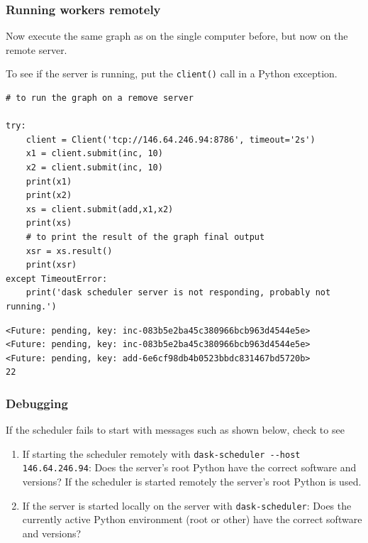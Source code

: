 \subsubsection{Running workers remotely}
\label{sec:Runningworkersremotely}

Now execute the same graph as on the single computer before, but now on the remote server.


To see if the server is running, put the \verb+client()+ call in a Python exception.



\begin{lstlisting}[style=incellstyle]
# to run the graph on a remove server

try:
    client = Client('tcp://146.64.246.94:8786', timeout='2s')
    x1 = client.submit(inc, 10)
    x2 = client.submit(inc, 10)
    print(x1)
    print(x2)
    xs = client.submit(add,x1,x2)
    print(xs)
    # to print the result of the graph final output
    xsr = xs.result()
    print(xsr)
except TimeoutError:
    print('dask scheduler server is not responding, probably not running.')

\end{lstlisting}


\begin{lstlisting}[style=outcellstyle]
<Future: pending, key: inc-083b5e2ba45c380966bcb963d4544e5e>
<Future: pending, key: inc-083b5e2ba45c380966bcb963d4544e5e>
<Future: pending, key: add-6e6cf98db4b0523bbdc831467bd5720b>
22

\end{lstlisting}


\subsubsection{Debugging}
\label{sec:Debugging}

If the scheduler fails to start with messages such as shown below, check to see


\begin{enumerate}
\item If starting the scheduler remotely with \verb+dask-scheduler --host 146.64.246.94+: Does the server's root Python have the correct software and versions? If the scheduler is started remotely the server's root Python is used.
\item If the server is started locally on the server with \verb+dask-scheduler+: Does the currently active Python environment (root or other) have the correct software and versions?
\end{enumerate}

